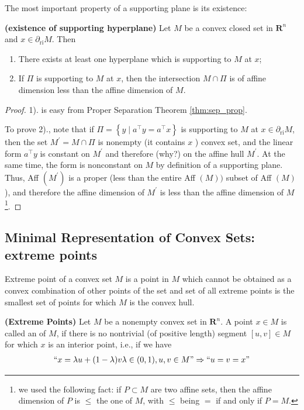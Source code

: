 \documentclass{article}
\newcommand{\bfs}[1]{\textbf{({#1}) }}
\begin{document}
The most important property of a supporting plane is its existence:
\begin{lema}{\bfs{existence of supporting hyperplane}}\label{lem:exis_supp_p}
 Let $M$ be a convex closed set in $\mathbf{R}^{n}$ and  $x\in \partial_{\mathrm{ri}} M$. Then
 \begin{enumerate}
     \item There exists at least one hyperplane which is supporting to $M$ at $x$;
     \item  If $\Pi$ is supporting to $M$ at $x$, then the intersection $M \cap \Pi$ is of affine dimension less than  the affine dimension of $M$.
 \end{enumerate}
\end{lema}
\begin{proof}\color{ForestGreen}
1). is easy from Proper Separation Theorem \cref{thm:sep_prop}.

To prove 2)., note that if $\Pi=\left\{y \mid a^{\top} y=a^{\top} x\right\}$ is supporting to $M$ at $x \in \partial_{\mathrm{ri}} M$, then the set $M^{\prime}=M \cap \Pi$ is nonempty (it contains $x$ ) convex set, and the linear form $a^{\top} y$ is constant on $M^{\prime}$ and therefore (why?) on the affine hull $M^{\prime}$. At the same time, the form is nonconstant on $M$ by definition of a supporting plane. Thus, Aff $\left(M^{\prime}\right)$ is a proper (less than the entire Aff $(M))$ subset of Aff $(M)$), and therefore the affine dimension of $M^{\prime}$ is less than the affine dimension of $M$\footnote{we used the following fact: if $P \subset M$ are two affine sets, then the affine dimension of $P$ is $\leq$ the one of $M$, with $\leq$ being $=$ if and only if $P=M$.}.
\end{proof} 


\subsection{Minimal Representation of Convex Sets: extreme points}
Extreme point of a convex set $M$ is a point in $M$ which cannot be obtained as a convex combination of other points of the set and set of all extreme points is the smallest set of points for which $M$ is the convex hull.
\begin{defa}{\bfs{Extreme Points}}
  Let $M$ be a nonempty convex set in $\mathbf{R}^{n}$. A point $x \in M$ is called an  of $M$, if there is no nontrivial (of positive length) segment $[u, v] \in M$ for which $x$ is an interior point, i.e., if we have
\begin{align*}
``x=\lambda u+(1-\lambda) v  \lambda \in(0,1), u,v\in M"\Rightarrow  ``u=v=x"
\end{align*}
\end{defa}
\end{document}
